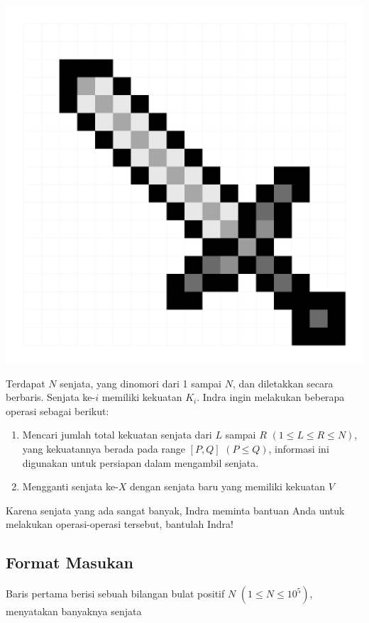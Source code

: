 \documentclass{article}
\begin{document}
\begin{center}
\includegraphics[scale=0.05]{iron-sword.png}
\end{center}
Terdapat $N$ senjata, yang dinomori dari 1 sampai $N$, dan diletakkan secara berbaris. Senjata ke-$i$ memiliki kekuatan $K_i$. Indra ingin melakukan beberapa operasi sebagai berikut:

\begin{enumerate}

\item Mencari jumlah total kekuatan senjata dari $L$ sampai $R$ $(1 \leq L \leq R \leq N)$, yang kekuatannya berada pada range $\left[P, Q\right]$ $(P \leq Q)$, informasi ini digunakan untuk persiapan dalam mengambil senjata.

\item Mengganti senjata ke-$X$ dengan senjata baru yang memiliki kekuatan $V$

\end{enumerate}

Karena senjata yang ada sangat banyak, Indra meminta bantuan Anda untuk melakukan operasi-operasi tersebut, bantulah Indra!

\subsection*{Format Masukan}

Baris pertama berisi sebuah bilangan bulat positif $N$ $(1 \leq N \leq 10^5)$, menyatakan banyaknya senjata
\end{document}
